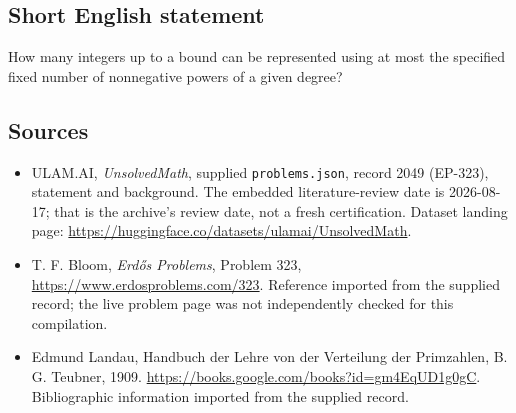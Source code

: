 \documentclass[11pt,a4paper]{article}
\begin{document}
\subsection{Short English statement}

How many integers up to a bound can be represented using at most the specified fixed number of nonnegative powers of a given degree?

\subsection{Sources}

{\small

\begin{itemize}

\item[\hypertarget{source:2049:1}{S1}] ULAM.AI, \emph{UnsolvedMath}, supplied \texttt{problems.json}, record 2049 (EP-323), statement and background. The embedded literature-review date is 2026-08-17; that is the archive’s review date, not a fresh certification. Dataset landing page: \url{https://huggingface.co/datasets/ulamai/UnsolvedMath}.

\item[\hypertarget{source:2049:2}{S2}] T. F. Bloom, \emph{Erdős Problems}, Problem 323, \url{https://www.erdosproblems.com/323}. Reference imported from the supplied record; the live problem page was not independently checked for this compilation.

\item[\hypertarget{source:2049:3}{S3}] Edmund Landau, Handbuch der Lehre von der Verteilung der Primzahlen, B. G. Teubner, 1909. \url{https://books.google.com/books?id=gm4EqUD1g0gC}. Bibliographic information imported from the supplied record.

\end{itemize}

}

\label{end:2049}
\end{document}
